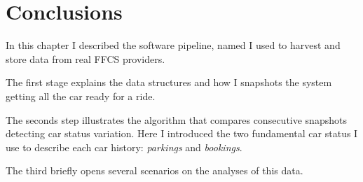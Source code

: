 \section{Conclusions}
\label{sec:2_6_conclusions}
In this chapter I described the software pipeline, named \tool I used to harvest and store data from real FFCS providers. 

The first stage explains the data structures and how I snapshots the system getting all the car ready for a ride. 

The seconds step illustrates the algorithm that compares consecutive snapshots detecting car status variation. Here I introduced the two fundamental car status I use to describe each car history: \textit{parkings} and \textit{bookings}. 

The third briefly opens several scenarios on the analyses of this data.


